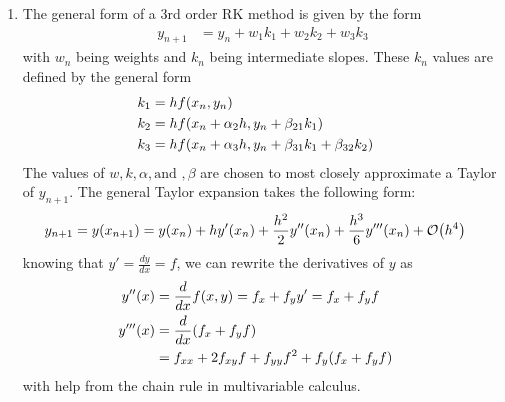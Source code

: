 \documentclass[12pt]{article}
\DeclarePairedDelimiter\rb{(}{)}
\begin{document}
\begin{enumerate}[label=(\alph*)]
    \item The general form of a 3rd order RK method is given by the form
        \begin{align*}
            y_{n+1} & =  y_{n} + w_{1} k_{1} + w_{2} k_{2} + w_{3} k_{3}
        \end{align*}
        with \(w_{n}\) being weights and \(k_{n}\) being intermediate slopes. These \(k_{n}\) values are defined by the general form
        \begin{align*}
            k_{1} & =  h f \rb*{x_{n}, y_{n}} &\\
            k_{2} & =  h f \rb*{ x_{n} + \alpha_{2} h , y_{n} + \beta_{21} k_{1}} &\\
            k_{3} & =  h f \rb*{ x_{n} + \alpha_{3} h , y_{n} + \beta_{31} k_{1} + \beta_{32} k_{2}} &\\
        \end{align*}
        The values of \(w, k, \alpha, \text{and }, \beta\) are chosen to most closely approximate a Taylor of \(y_{n+1}\). The general Taylor expansion takes the following form:
        \begin{align*}
            y_{n+1} & =  y\rb*{x_{n+1}} = y \rb*{x_{n}} + h y'\rb*{x_{n}} 
            + \frac{h^{2}}{2} y''\rb*{x_{n}} + \frac{h^{3}}{6} y''' \rb*{x_{n}} + \mathcal{O} \rb*{h^{4}} &\\
        \end{align*}
        knowing that \(y' = \frac{d y}{d x} = f\), we can rewrite the derivatives of \(y\) as 
        \begin{align*}
            y'' \rb*{x} & =  \frac{d }{d x} f\rb*{x,y} = f_{x} + f_{y}y' = f_{x} + f_{y} f &\\
            y''' \rb*{x} & =  \frac{d }{d x} \rb*{f_{x} + f_{y} f} &\\
            & = f_{xx} + 2 f_{xy} f + f_{yy} f^{2} + f_{y} \rb*{f_{x} + f_{y} f} &\\
        \end{align*}
        with help from the chain rule in multivariable calculus. 


\end{enumerate}
\end{document}
